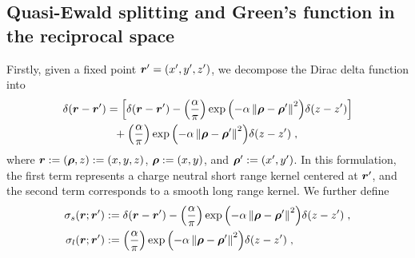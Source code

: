 \subsection{Quasi-Ewald splitting and Green's function in the reciprocal space}
Firstly, given a fixed point  $\boldsymbol{r}^\prime=(x^{\prime}, y^{\prime},z^{\prime})$, we decompose   the Dirac delta function into
\begin{equation}\label{eq...text...Quasi-EwaldMethod...QuasiEwaldSplitting}
\begin{aligned}
    \delta(\boldsymbol{r}-\boldsymbol{r}^\prime) &= \left[\delta (\boldsymbol{r}-\boldsymbol{r}^\prime) - {\left( \frac{\alpha}{\pi} \right)} \exp{\left(-\alpha \left\lVert\bm{\rho}-\bm{\rho}^\prime\right\rVert^2\right)} \delta(z-z^\prime) \right]\\&~~ + {\left( \frac{\alpha}{\pi} \right)} \exp{\left(-\alpha \left\lVert\bm{\rho}-\bm{\rho}^\prime\right\rVert^2\right)} \delta(z-z^\prime)\;,
    \end{aligned}
\end{equation}
where $\bm{r}:=(\bm{\rho}, z):=(x,y,z)$,   $\bm{\rho}:=(x,y)$, and $\bm{\rho}^\prime:=(x^\prime,y^\prime)$.
 In this formulation, the first term represents  a charge neutral short range kernel centered at $\bm{r}^\prime$, and the second term corresponds to a smooth long range kernel.  We further define  
\begin{equation}\label{eq...text...Kernels}
    \begin{split}
        \sigma_{s}(\boldsymbol{r}; \bm{r}^\prime) &:= \delta (\boldsymbol{r}-\boldsymbol{r}^\prime) - {\left( \frac{\alpha}{\pi} \right)} \exp{\left(-\alpha \left\lVert\bm{\rho}-\bm{\rho}^\prime\right\rVert^2\right)} \delta(z-z^\prime)\;,\\
        \sigma_{l}(\boldsymbol{r};\bm{r}^\prime) &:= {\left( \frac{\alpha}{\pi} \right)} \exp{\left(-\alpha \left\lVert\bm{\rho}-\bm{\rho}^\prime\right\rVert^2\right)} \delta(z-z^\prime)\;,
    \end{split}
\end{equation}
